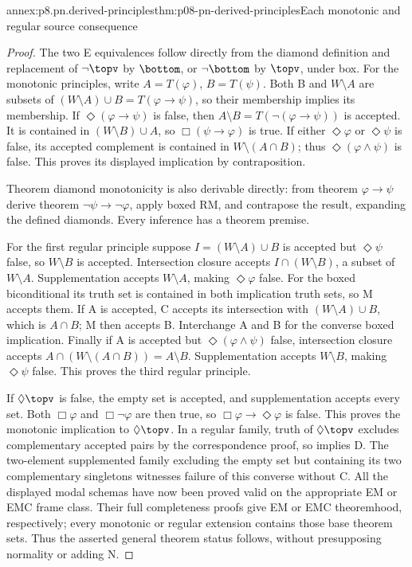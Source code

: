 \begin{annexitem}{annex:p8.pn.derived-principles}{thm:p08-pn-derived-principles}{Each monotonic and regular source consequence}
\begin{proof}
The two E equivalences follow directly from the diamond definition
and replacement of \(\neg\topv\) by \(\bottom\), or
\(\neg\bottom\) by \(\topv\), under box. For the monotonic
principles, write \(A=T(\varphi)\), \(B=T(\psi)\).
Both B and \(W\setminus A\) are subsets of
\((W\setminus A)\cup B=T(\varphi\to\psi)\), so their
membership implies its membership. If
\(\Diamond(\varphi\to\psi)\) is false, then
\(A\setminus B=T(\neg(\varphi\to\psi))\) is accepted.
It is contained in \((W\setminus B)\cup A\), so
\(\Box(\psi\to\varphi)\) is true. If either
\(\Diamond\varphi\) or \(\Diamond\psi\) is false,
its accepted complement is contained in
\(W\setminus(A\cap B)\); thus \(\Diamond(\varphi\land\psi)\)
is false. This proves its displayed implication by contraposition.

Theorem diamond monotonicity is also derivable directly: from
theorem \(\varphi\to\psi\) derive theorem
\(\neg\psi\to\neg\varphi\), apply boxed RM, and
contrapose the result, expanding the defined diamonds. Every
inference has a theorem premise.

For the first regular principle suppose
\(I=(W\setminus A)\cup B\) is accepted but
\(\Diamond\psi\) false, so \(W\setminus B\) is accepted.
Intersection closure accepts \(I\cap(W\setminus B)\),
a subset of \(W\setminus A\). Supplementation accepts
\(W\setminus A\), making \(\Diamond\varphi\) false.
For the boxed biconditional its truth set is contained in both
implication truth sets, so M accepts them. If A is accepted,
C accepts its intersection with \((W\setminus A)\cup B\),
which is \(A\cap B\); M then accepts B. Interchange A and B
for the converse boxed implication. Finally if A is accepted
but \(\Diamond(\varphi\land\psi)\) false, intersection
closure accepts \(A\cap(W\setminus(A\cap B))=A\setminus B\).
Supplementation accepts \(W\setminus B\), making
\(\Diamond\psi\) false. This proves the third regular principle.

If \(\Diamond\topv\) is false, the empty set is accepted,
and supplementation accepts every set. Both \(\Box\varphi\)
and \(\Box\neg\varphi\) are then true, so
\(\Box\varphi\to\Diamond\varphi\) is false. This proves
the monotonic implication to \(\Diamond\topv\). In a regular
family, truth of \(\Diamond\topv\) excludes complementary
accepted pairs by the correspondence proof, so implies D.
The two-element supplemented family excluding the empty set
but containing its two complementary singletons witnesses failure
of this converse without C. All the displayed modal schemas have
now been proved valid on the appropriate EM or EMC frame class.
Their full completeness proofs give EM or EMC theoremhood,
respectively; every monotonic or regular extension contains those
base theorem sets. Thus the asserted general theorem status follows,
without presupposing normality or adding N.
\end{proof}
\end{annexitem}

